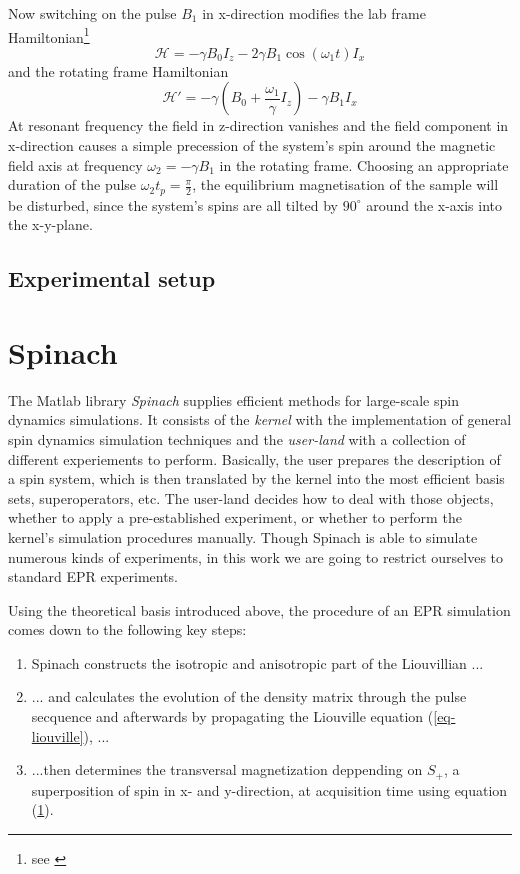 \documentclass[11.5pt,a4paper]{article}
\begin{document}
Now switching on the pulse $B_1$ in x-direction modifies the lab frame Hamiltonian\footnote{see \cite[Chap. 4.2.2 The resonant radiofrequency field, p.111f]{nmr-ox}}
\begin{equation}
 \mathcal{H} = - \gamma B_0 I_z - 2 \gamma B_1 \cos(\omega_1 t) I_x
\end{equation}
and the rotating frame Hamiltonian
\begin{equation}
  \mathcal{H}' = - \gamma ( B_0 + \frac{\omega_1}{\gamma}I_z) - \gamma B_1 I_x
\end{equation}
At resonant frequency the field in z-direction vanishes and the field component in x-direction causes a simple precession of the system's spin around the magnetic field axis at frequency $\omega_2 = - \gamma B_1$ in the rotating frame. Choosing an appropriate duration of the pulse $\omega_2 t_p = \tfrac{\pi}{2}$, the equilibrium magnetisation of the sample will be disturbed, since the system's spins are all tilted by $90^\circ$ around the x-axis into the x-y-plane. 

\subsection{Experimental setup}

\section{Spinach}
The Matlab library \emph{Spinach} supplies efficient methods for large-scale spin dynamics simulations. It consists of the \emph{kernel} with the implementation of general spin dynamics simulation techniques and the \emph{user-land} with a collection of different experiements to perform. Basically, the user prepares the description of a spin system, which is then translated by the kernel into the most efficient basis sets, superoperators, etc. The user-land decides how to deal with those objects, whether to apply a pre-established experiment, or whether to perform the kernel's simulation procedures manually. Though Spinach is able to simulate numerous kinds of experiments, in this work we are going to restrict ourselves to standard EPR experiments. 

Using the theoretical basis introduced above, the procedure of an EPR simulation comes down to the following key steps:
\begin{enumerate}
 \item Spinach constructs the isotropic and anisotropic part of the Liouvillian ...
 \item ... and calculates the evolution of the density matrix through the pulse secquence and afterwards by propagating the Liouville equation (\ref{eq-liouville}), ...
 \item ...then determines the transversal magnetization deppending on $S_+$, a superposition of spin in x- and y-direction, at acquisition time using equation (\ref{}).
\end{enumerate}
\end{document}
